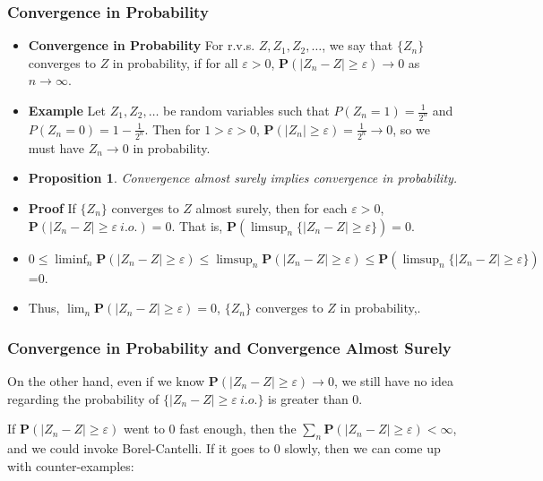 \documentclass[handout]{beamer}
\newtheorem{Proposition}[theorem]{Proposition}%
\newcommand{\BP}{\mathbf{P}}
\begin{document}
\frame
{
  \frametitle{Convergence in Probability}

   \begin{itemize}
     \item<1-> \textbf{Convergence in Probability} For r.v.s. $Z, Z_1, Z_2, \ldots$, we say that $\{Z_n\}$ converges to $Z$ in probability, if for all $\varepsilon>0$, $\BP(|Z_n-Z|\geq \varepsilon) \rightarrow 0$ as $n\rightarrow \infty$. 
     
      
      \item<2-> \textbf{Example} Let $Z_1, Z_2, \ldots$ be random variables such that $P(Z_n=1)=\frac{1}{2^n}$ and $P(Z_n=0)=1-\frac{1}{2^n}$. Then for $1>\varepsilon>0$, $\BP(|Z_n|\geq \varepsilon)=\frac{1}{2^n}\rightarrow 0$, so we must have $Z_n\rightarrow 0$ in probability. 
      
   \item<3->[]     \begin{Proposition} Convergence almost surely implies convergence in probability.  \end{Proposition}       

  \item<4-> \textbf{Proof} If $\{Z_n\}$ converges to $Z$ almost surely, then for each $\varepsilon>0$, $\BP(|Z_n-Z| \geq \varepsilon \  i.o.)=0$. That is, $\BP(\limsup_n \{|Z_n-Z| \geq \varepsilon\})=0$.  
    
    \item<5->[-] $0\leq \liminf_n \BP(|Z_n-Z| \geq \varepsilon )\leq \limsup_n \BP(|Z_n-Z| \geq \varepsilon) \leq \BP(\limsup_n \{|Z_n-Z| \geq \varepsilon\})$=0. 
    
     \item<6->[-]  Thus, $\lim_n \BP(|Z_n-Z| \geq \varepsilon)=0$,  $\{Z_n\}$ converges to $Z$ in probability,.  
                                
\end{itemize}
}



\frame
{
  \frametitle{Convergence in Probability and Convergence Almost Surely}

	On the other hand, even if we know $\BP(|Z_n-Z| \geq \varepsilon) \to 0$, we still have no idea regarding the probability of $\{ |Z_n-Z| \geq \varepsilon \ i.o. \}$ is greater than 0. 
	\newline
		
	If $\BP(|Z_n-Z| \geq \varepsilon)$ went to $0$ fast enough, then the $\sum_n \BP(|Z_n-Z| \geq \varepsilon) < \infty$, and we could invoke Borel-Cantelli. If it goes to $0$ slowly, then we can come up with counter-examples:       

}
\end{document}
